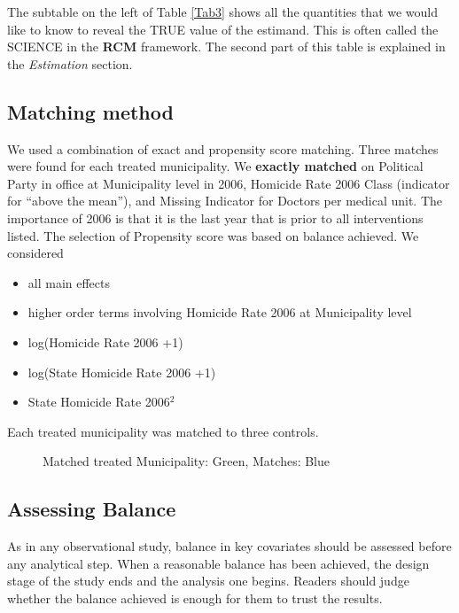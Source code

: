 \documentclass{article}[11 pt]
\begin{document}
The subtable on the left of Table \ref{Tab3} shows all the quantities that we would like to know to reveal the TRUE value of the estimand. This is often called the SCIENCE in the \textbf{RCM} framework. The second part of this table is explained in the \emph{Estimation} section.					

\subsection{Matching method}
We used a combination of exact and propensity score matching. Three matches were found for each treated municipality. We \textbf{exactly matched} on Political Party in office at Municipality level in 2006, Homicide Rate 2006 Class (indicator for ``above the mean''), and Missing Indicator for Doctors per medical unit. The importance of 2006 is that it is the last year that is prior to all interventions listed. The selection of Propensity score was based on balance achieved. We considered
\begin{itemize}
	 \item all main effects
	\item higher order terms involving Homicide Rate 2006 at Municipality level
	\item log(Homicide Rate 2006 +1)
	\item log(State Homicide Rate 2006 +1)
	\item State Homicide Rate 2006$^2$
\end{itemize}
Each treated municipality was matched to three controls.

 

\begin{figure}[htdp]
    \centering
{}
	\hspace{2cm}
\caption{Matched treated Municipality: Green, Matches: Blue}
\label{FigMatches}	
\end{figure}	


\subsection{Assessing Balance}
As in any observational study, balance in key covariates should be assessed before any analytical step. When a reasonable balance has been achieved, the design stage of the study ends and the analysis one begins. Readers should judge whether the balance achieved is enough for them to trust the results.  
\end{document}
